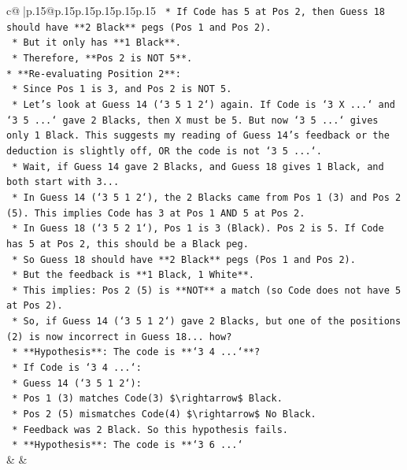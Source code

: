 \documentclass{article}
\begin{document}
{\begin{supertabular}{c@{$\;$}|p{.15\linewidth}@{}p{.15\linewidth}p{.15\linewidth}p{.15\linewidth}p{.15\linewidth}p{.15\linewidth}}
{{{\texttt{        *   If Code has 5 at Pos 2, then Guess 18 should have **2 Black** pegs (Pos 1 and Pos 2).} \\
\texttt{        *   But it only has **1 Black**.} \\
\texttt{        *   Therefore, **Pos 2 is NOT 5**.} \\
\texttt{*   **Re{-}evaluating Position 2**:} \\
\texttt{    *   Since Pos 1 is 3, and Pos 2 is NOT 5.} \\
\texttt{    *   Let's look at Guess 14 (`3 5 1 2`) again. If Code is `3 X ...` and `3 5 ...` gave 2 Blacks, then X must be 5. But now `3 5 ...` gives only 1 Black. This suggests my reading of Guess 14's feedback or the deduction is slightly off, OR the code is not `3 5 ...`.} \\
\texttt{    *   Wait, if Guess 14 gave 2 Blacks, and Guess 18 gives 1 Black, and both start with 3...} \\
\texttt{    *   In Guess 14 (`3 5 1 2`), the 2 Blacks came from Pos 1 (3) and Pos 2 (5). This implies Code has 3 at Pos 1 AND 5 at Pos 2.} \\
\texttt{    *   In Guess 18 (`3 5 2 1`), Pos 1 is 3 (Black). Pos 2 is 5. If Code has 5 at Pos 2, this should be a Black peg.} \\
\texttt{    *   So Guess 18 should have **2 Black** pegs (Pos 1 and Pos 2).} \\
\texttt{    *   But the feedback is **1 Black, 1 White**.} \\
\texttt{    *   This implies: Pos 2 (5) is **NOT** a match (so Code does not have 5 at Pos 2).} \\
\texttt{    *   So, if Guess 14 (`3 5 1 2`) gave 2 Blacks, but one of the positions (2) is now incorrect in Guess 18... how?} \\
\texttt{    *   **Hypothesis**: The code is **`3 4 ...`**?} \\
\texttt{        *   If Code is `3 4 ...`:} \\
\texttt{        *   Guess 14 (`3 5 1 2`):} \\
\texttt{            *   Pos 1 (3) matches Code(3) \$\textbackslash{}rightarrow\$ Black.} \\
\texttt{            *   Pos 2 (5) mismatches Code(4) \$\textbackslash{}rightarrow\$ No Black.} \\
\texttt{            *   Feedback was 2 Black. So this hypothesis fails.} \\
\texttt{    *   **Hypothesis**: The code is **`3 6 ...`} \\
            }
        }
    }
    & & \\ \\


\end{supertabular}}
\end{document}
